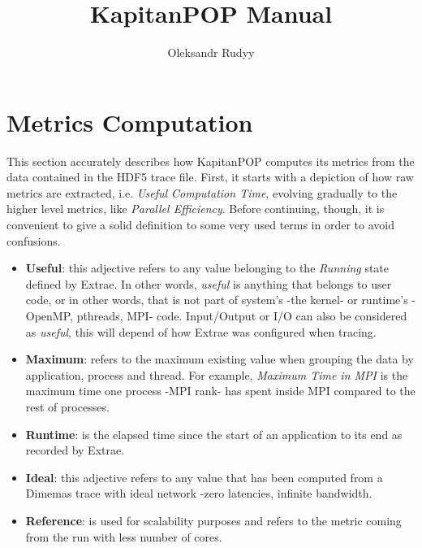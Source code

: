 \documentclass[article,12pt]{memoir}
\begin{document}
	
	
	
	\title{KapitanPOP Manual}
	\author{Oleksandr Rudyy}
	
	\maketitle
	\chapter{Metrics Computation}
	This section accurately describes how KapitanPOP computes its metrics from the data contained in the HDF5 trace file. First, it starts with a depiction of how raw metrics are extracted, i.e. \textit{Useful Computation Time}, evolving gradually to the higher level metrics, like \textit{Parallel Efficiency}. Before continuing, though, it is convenient to give a solid definition to some very used terms in order to avoid confusions.
	
	\begin{itemize}
		\item \textbf{Useful}: this adjective refers to any value belonging to the \textit{Running} state defined by Extrae. In other words, \textit{useful} is anything that belongs to user code, or in other words, that is not part of system's -the kernel- or runtime's -OpenMP, pthreads, MPI- code. Input/Output or I/O can also be considered as \textit{useful}, this will depend of how Extrae was configured when tracing.
		\item \textbf{Maximum}: refers to the maximum existing value when grouping the data by application, process and thread. For example, \textit{Maximum Time in MPI} is the maximum time one process -MPI rank- has spent inside MPI compared to the rest of processes.
		\item \textbf{Runtime}: is the elapsed time since the start of an application to its end as recorded by Extrae.
		\item \textbf{Ideal}: this adjective refers to any value that has been computed from a Dimemas trace with ideal network -zero latencies, infinite bandwidth.
		\item \textbf{Reference}: is used for scalability purposes and refers to the metric coming from the run with less number of cores. 
	\end{itemize}
\end{document}
